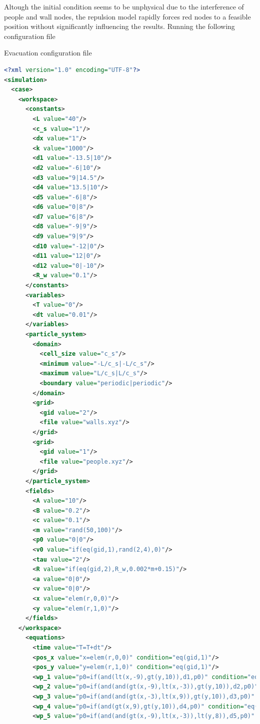 \documentclass[a4paper,12pt,openany]{book}
\theoremstyle{break}
\begin{document}
Altough the initial condition seems to be unphysical due to the interference of people and wall nodes, the repulsion model rapidly forces red nodes to a feasible position without significantly influencing the results.
Running the following configuration file
\begin{samepage}
\begin{example}{Evacuation configuration file}{}
\lstset{basicstyle=\tiny}
\begin{lstlisting}[language=XML]
<?xml version="1.0" encoding="UTF-8"?>
<simulation>
  <case>
    <workspace>
      <constants>
        <L value="40"/>
        <c_s value="1"/>
        <dx value="1"/>
        <k value="1000"/>
        <d1 value="-13.5|10"/>
        <d2 value="-6|10"/>
        <d3 value="9|14.5"/>
        <d4 value="13.5|10"/>
        <d5 value="-6|8"/>
        <d6 value="0|8"/>
        <d7 value="6|8"/>
        <d8 value="-9|9"/>
        <d9 value="9|9"/>
        <d10 value="-12|0"/>
        <d11 value="12|0"/>
        <d12 value="0|-10"/>
        <R_w value="0.1"/>
      </constants>
      <variables>
        <T value="0"/>
        <dt value="0.01"/>
      </variables>
      <particle_system>
        <domain>
          <cell_size value="c_s"/>
          <minimum value="-L/c_s|-L/c_s"/>
          <maximum value="L/c_s|L/c_s"/>
          <boundary value="periodic|periodic"/>
        </domain>
        <grid>
          <gid value="2"/>
          <file value="walls.xyz"/>
        </grid>
        <grid>
          <gid value="1"/>
          <file value="people.xyz"/>
        </grid>
      </particle_system>
      <fields>
        <A value="10"/>
        <B value="0.2"/>
        <c value="0.1"/>
        <m value="rand(50,100)"/>
        <p0 value="0|0"/>
        <v0 value="if(eq(gid,1),rand(2,4),0)"/>
        <tau value="2"/>
        <R value="if(eq(gid,2),R_w,0.002*m+0.15)"/>
        <a value="0|0"/>
        <v value="0|0"/>
        <x value="elem(r,0,0)"/>
        <y value="elem(r,1,0)"/>
      </fields>
    </workspace>
      <equations>
        <time value="T=T+dt"/>
        <pos_x value="x=elem(r,0,0)" condition="eq(gid,1)"/>
        <pos_y value="y=elem(r,1,0)" condition="eq(gid,1)"/>
        <wp_1 value="p0=if(and(lt(x,-9),gt(y,10)),d1,p0)" condition="eq(gid,1)"/>
        <wp_2 value="p0=if(and(and(gt(x,-9),lt(x,-3)),gt(y,10)),d2,p0)" condition="eq(gid,1)"/>
        <wp_3 value="p0=if(and(and(gt(x,-3),lt(x,9)),gt(y,10)),d3,p0)" condition="eq(gid,1)"/>
        <wp_4 value="p0=if(and(gt(x,9),gt(y,10)),d4,p0)" condition="eq(gid,1)"/>
        <wp_5 value="p0=if(and(and(gt(x,-9),lt(x,-3)),lt(y,8)),d5,p0)" condition="eq(gid,1)"/>

\end{lstlisting}
\end{example}
\end{samepage}
\end{document}
